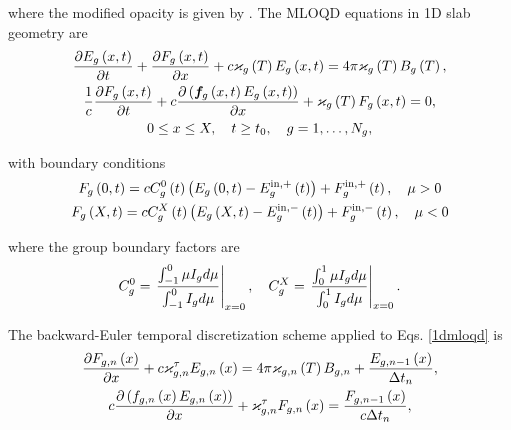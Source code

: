 	where the modified opacity is given by .
\fi
	The MLOQD equations in 1D slab geometry are
	\begin{subequations}
		\begin{gather}
			\frac{\partial E_g\left( x,t\right)}{\partial t} + \frac{\partial F_g\left( x,t\right)}{\partial x} + c\varkappa_{g}\left( T\right)E_g\left( x,t\right) = 4\pi\varkappa_{g}\left( T\right)B_{g}\left( T\right), \label{mqd_1_1d} \\
			\frac{1}{c}\frac{\partial F_g\left( x,t\right)}{\partial t} + c\frac{\partial \left(\bm{f}_g\left( x,t\right)E_g\left( x,t\right)\right)}{\partial x} + \varkappa_{g}\left( T\right)F_g\left( x,t\right) = 0, \label{mqd_2_1d}\\
			0\leq x\leq X, \quad t\geq t_0, \quad g=1,\dots,N_g, \nonumber
		\end{gather}
		\label{1dmloqd}
	\end{subequations}
	
	with boundary conditions
	\begin{subequations}
		\begin{gather}
			F_g\left(0,t\right) = cC_g^0\left( t\right)\left(E_g\left(0,t\right) - E_g^{\text{in},+}\left( t\right)\right) + F_g^{\text{in},+}\left( t\right), \quad \mu>0\\
			F_g\left( X,t\right) = cC_g^X\left( t\right)\left(E_g\left( X,t\right) - E_g^{\text{in},-}\left( t\right)\right) + F_g^{\text{in},-}\left( t\right), \quad \mu<0
		\end{gather}
	\end{subequations}
	
	where the group boundary factors are
	\begin{align}
		C_{g}^{0} = \left. \frac{\int_{-1}^{0} \mu I_{g} d\mu }{\int_{-1}^{0} I_{g} d\mu} \right|_{x=0}, \quad C_{g}^{X} = \left. \frac{\int_{0}^{1} \mu I_{g} d\mu }{\int_{0}^{1} I_{g} d\mu} \right|_{x=0}.
	\end{align}
	
	The backward-Euler temporal discretization scheme applied to Eqs. \eqref{1dmloqd} is
	\begin{subequations}
		\begin{gather}
			\frac{\partial F_{g,n}\left( x\right)}{\partial x} + c\varkappa_{g,n}^\tau E_{g,n}\left( x\right) = 4\pi\varkappa_{g,n}\left( T\right)B_{g,n} + \frac{E_{g,n-1}\left( x\right)}{\Delta t_n},  \label{mqd_1_1dn}\\
			c\frac{\partial \left(f_{g,n}\left( x\right)E_{g,n}\left( x\right)\right)}{\partial x} + \varkappa_{g,n}^\tau F_{g,n}\left( x\right) = \frac{F_{g,n-1}\left( x\right)}{c\Delta t_n} \label{mqd_2_1dn},
		\end{gather}
	\end{subequations}
	
